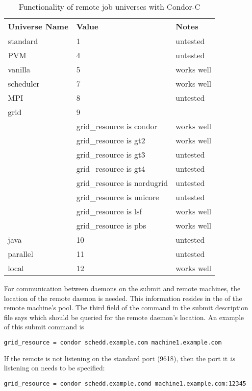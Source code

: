 \begin{center}
\begin{table}[hbt]
\begin{tabular}{|l|l|l}
\textbf{Universe Name} & \textbf{Value} & \textbf{Notes}\\ \hline \hline
standard  & 1 & untested \\ \hline
PVM       & 4 & untested \\ \hline
vanilla   & 5 & works well \\ \hline
scheduler & 7 & works well \\ \hline
MPI       & 8 & untested \\ \hline
grid      & 9 & \\
 & grid\_resource is condor & works well \\
 & grid\_resource is gt2  & works well \\
 & grid\_resource is gt3 & untested \\
 & grid\_resource is gt4 & untested \\ 
 & grid\_resource is nordugrid & untested \\ 
 & grid\_resource is unicore & untested \\
 & grid\_resource is lsf & works well \\
 & grid\_resource is pbs & works well \\ \hline
java & 10 & untested \\ \hline
parallel & 11 & untested \\ \hline
local & 12 & works well \\ \hline
\end{tabular}
\caption{\label{working-remote-universes}Functionality of remote job universes with Condor-C}
\end{table}
\end{center}

For communication between  daemons on the submit
and remote machines,
the location of the remote  daemon is needed.
This information resides in the  of the remote
machine's pool.
The third field of the  command in the submit description file
says which  should be queried for the remote 
daemon's location.
An example of this submit command is
\footnotesize
\begin{verbatim}
grid_resource = condor schedd.example.com machine1.example.com
\end{verbatim}
\normalsize
If the remote  is not listening on the standard port
(9618), then the port it \emph{is} listening on needs to be specified:
\footnotesize
\begin{verbatim}
grid_resource = condor schedd.example.comd machine1.example.com:12345
\end{verbatim}
\normalsize


